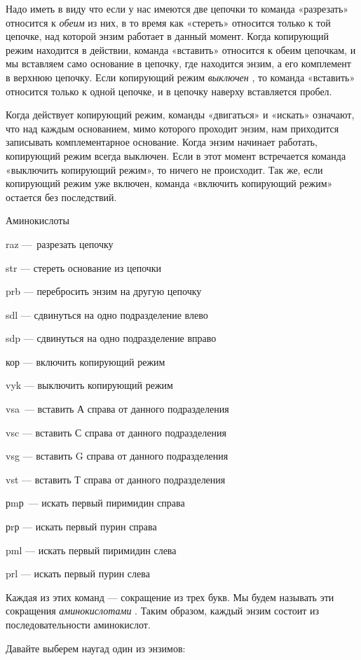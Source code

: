 \documentclass[../main.tex]{subfiles}
\begin{document}
Надо иметь в виду что если у нас имеются две цепочки то команда «разрезать» относится к \emph{обеим} из них, в то время как «стереть» относится только к той цепочке, над которой энзим работает в данный момент. Когда копирующий режим находится в действии, команда «вставить» относится к обеим цепочкам, и мы вставляем само основание в цепочку, где находится энзим, а его комплемент в верхнюю цепочку. Если копирующий режим \emph{выключен} , то команда «вставить» относится только к одной цепочке, и в цепочку наверху вставляется пробел.

Когда действует копирующий режим, команды «двигаться» и «искать» означают, что над каждым основанием, мимо которого проходит энзим, нам приходится записывать комплементарное основание. Когда энзим начинает работать, копирующий режим всегда выключен. Если в этот момент встречается команда «выключить копирующий режим», то ничего не происходит. Так же, если копирующий режим уже включен, команда «включить копирующий режим» остается без последствий.

Аминокислоты

raz ---~разрезать цепочку

str --- стереть основание из цепочки

prb --- перебросить энзим на другую цепочку

sdl --- сдвинуться на одно подразделение влево

sdp --- сдвинуться на одно подразделение вправо

кор --- включить копирующий режим

vyk --- выключить копирующий режим

vsa~--- вставить А справа от данного подразделения

vsc --- вставить С справа от данного подразделения

vsg --- вставить G справа от данного подразделения

vst --- вставить Т справа от данного подразделения

рmр~--- искать первый пиримидин справа

рrр --- искать первый пурин справа

pml --- искать первый пиримидин слева

prl --- искать первый пурин слева

Каждая из этих команд --- сокращение из трех букв. Мы будем называть эти сокращения \emph{аминокислотами} . Таким образом, каждый энзим состоит из последовательности аминокислот.

Давайте выберем наугад один из энзимов:
\end{document}
